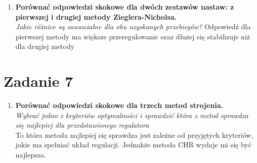 \documentclass[12pt, letterpaper]{article}
\begin{document}
\begin{enumerate}
            \item\textbf{Porównać odpowiedzi skokowe dla dwóch zestawów nastaw: z pierwszej i drugiej metody
            Zieglera-Nicholsa.}\\
            \emph{Jakie różnice są zauważalne dla obu uzyskanych przebiegów?}
            Odpowiedź dla pierwszej metody ma większe przeregulowanie oraz dłużej się stabilizuje
            niż dla drugiej metody

        \end{enumerate}

        \section*{Zadanie 7}
        \begin{enumerate}
            
            
                \emph{Czy można ustawić inne wartości parametrów regulatora PID tak, aby wartość
                kryterium ISE była mniejsza?}\\
                Tak\\
                \emph{Spróbować również ręcznie metodą prób i błędów
                znaleźć nastawy którepozwalają na lepszą regulację oraz sprawdzić za pomocą kry-
                terium ISE}
            
            \item\textbf{Porównać odpowiedzi skokowe dla trzech metod strojenia.}\\
            \emph{Wybrać jedno z kryteriów optymalności i sprawdzić która z metod sprawdza się
            najlepiej dla przedstawionego regulatora}\\
            To która metoda najlepiej się sprawdza jest zależne od przyjętych kryteriów,
            jakie ma spełniać układ regulacji. Jednakże metoda CHR wydaje mi się być najlepsza.
            
        \end{enumerate}
        
\end{document}

